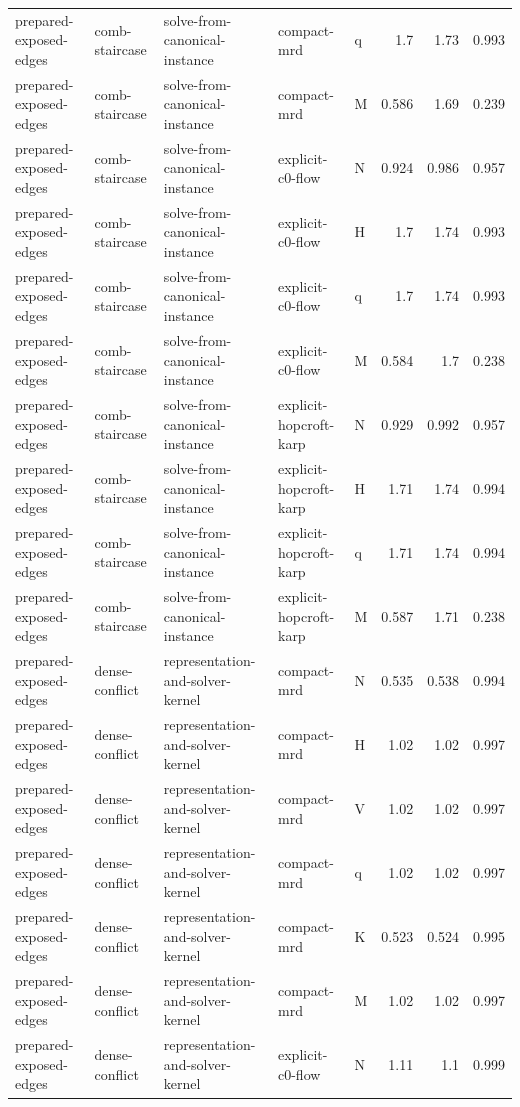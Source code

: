 \begin{table}[t]
\begin{tabular}{lllllrrr}
prepared-exposed-edges & comb-staircase & solve-from-canonical-instance & compact-mrd & q & 1.7 & 1.73 & 0.993 \\
prepared-exposed-edges & comb-staircase & solve-from-canonical-instance & compact-mrd & M & 0.586 & 1.69 & 0.239 \\
prepared-exposed-edges & comb-staircase & solve-from-canonical-instance & explicit-c0-flow & N & 0.924 & 0.986 & 0.957 \\
prepared-exposed-edges & comb-staircase & solve-from-canonical-instance & explicit-c0-flow & H & 1.7 & 1.74 & 0.993 \\
prepared-exposed-edges & comb-staircase & solve-from-canonical-instance & explicit-c0-flow & q & 1.7 & 1.74 & 0.993 \\
prepared-exposed-edges & comb-staircase & solve-from-canonical-instance & explicit-c0-flow & M & 0.584 & 1.7 & 0.238 \\
prepared-exposed-edges & comb-staircase & solve-from-canonical-instance & explicit-hopcroft-karp & N & 0.929 & 0.992 & 0.957 \\
prepared-exposed-edges & comb-staircase & solve-from-canonical-instance & explicit-hopcroft-karp & H & 1.71 & 1.74 & 0.994 \\
prepared-exposed-edges & comb-staircase & solve-from-canonical-instance & explicit-hopcroft-karp & q & 1.71 & 1.74 & 0.994 \\
prepared-exposed-edges & comb-staircase & solve-from-canonical-instance & explicit-hopcroft-karp & M & 0.587 & 1.71 & 0.238 \\
prepared-exposed-edges & dense-conflict & representation-and-solver-kernel & compact-mrd & N & 0.535 & 0.538 & 0.994 \\
prepared-exposed-edges & dense-conflict & representation-and-solver-kernel & compact-mrd & H & 1.02 & 1.02 & 0.997 \\
prepared-exposed-edges & dense-conflict & representation-and-solver-kernel & compact-mrd & V & 1.02 & 1.02 & 0.997 \\
prepared-exposed-edges & dense-conflict & representation-and-solver-kernel & compact-mrd & q & 1.02 & 1.02 & 0.997 \\
prepared-exposed-edges & dense-conflict & representation-and-solver-kernel & compact-mrd & K & 0.523 & 0.524 & 0.995 \\
prepared-exposed-edges & dense-conflict & representation-and-solver-kernel & compact-mrd & M & 1.02 & 1.02 & 0.997 \\
prepared-exposed-edges & dense-conflict & representation-and-solver-kernel & explicit-c0-flow & N & 1.11 & 1.1 & 0.999 \\

\end{tabular}
\end{table}

